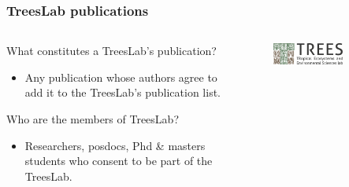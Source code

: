 \documentclass[aspectratio=169]{beamer}
\begin{document}
\begin{frame}
	\frametitle{TreesLab publications}
	\begin{columns}
		\begin{column}{0.5\textwidth}
            What constitutes a TreesLab's publication?
			\begin{itemize}
                \item Any publication whose authors agree to add it to the  
                    TreesLab's publication list.
			\end{itemize}
            \vspace{\baselineskip}
            Who are the members of TreesLab?
			\begin{itemize}
                \item Researchers, pos\-docs, Phd \& masters students who 
                    consent to be part of the TreesLab. 
			\end{itemize}
		\end{column}
		\begin{column}{0.5\textwidth}
			\begin{figure}
				\centering
				\includegraphics[width=0.7\textwidth]{logos/trees-color-h_2.png}
			\end{figure}
		\end{column}
	\end{columns}
\end{frame}
\end{document}
